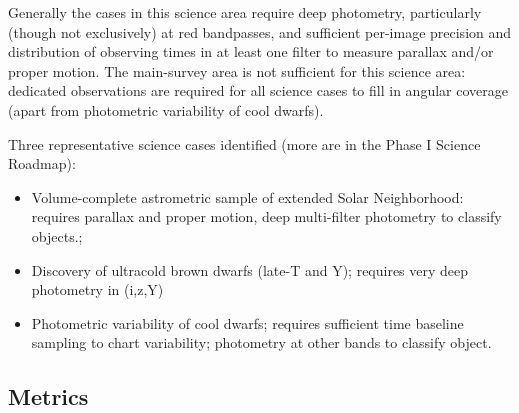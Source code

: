 Generally the cases in this science area require deep photometry,
particularly (though not exclusively) at red bandpasses, and
sufficient per-image precision and distribution of observing times in
at least one filter to measure parallax and/or proper motion. The
main-survey area is not sufficient for this science area: dedicated
observations are required for all science cases to fill in angular
coverage (apart from photometric variability of cool dwarfs).

Three representative science cases identified (more are in the Phase I
Science Roadmap):
\begin{itemize}

\item Volume-complete astrometric sample of extended Solar Neighborhood: requires parallax and proper motion, deep multi-filter photometry to classify objects.; 
\item Discovery of ultracold brown dwarfs (late-T and Y); requires very deep photometry in (i,z,Y) 

\item Photometric variability of cool dwarfs; requires sufficient time baseline sampling to chart variability; photometry at other bands to classify object. 

\end{itemize}





\subsection{Metrics}
\label{sec:keyword:metrics}

